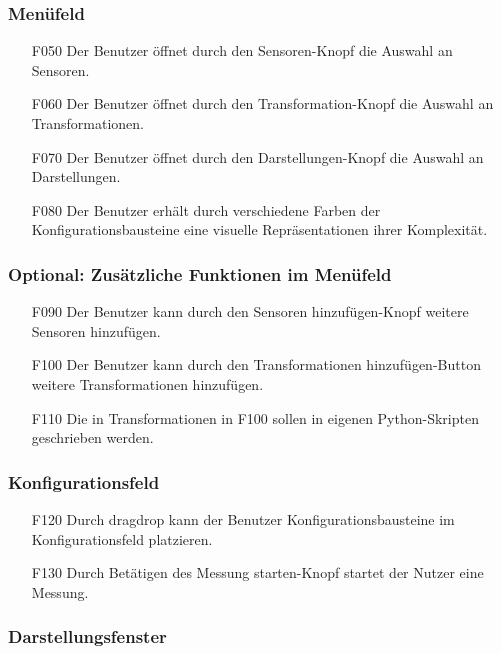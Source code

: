 \documentclass[parskip=full]{scrartcl}
\begin{document}
\subsubsection{Menüfeld}

\begin{itemize}
\item[F050] Der Benutzer öffnet durch den Sensoren-Knopf die Auswahl an Sensoren.
\item[F060] Der Benutzer öffnet durch den Transformation-Knopf die Auswahl an Transformationen.
\item[F070] Der Benutzer öffnet durch den Darstellungen-Knopf die Auswahl an Darstellungen.
\item[F080] Der Benutzer erhält durch verschiedene Farben der Konfigurationsbausteine eine visuelle Repräsentationen ihrer Komplexität.
\end{itemize}

\subsubsection{Optional: Zusätzliche Funktionen im Menüfeld}

\begin{itemize}

\item[F090] Der Benutzer kann durch den Sensoren hinzufügen-Knopf weitere Sensoren hinzufügen.
\item[F100] Der Benutzer kann durch den Transformationen hinzufügen-Button weitere Transformationen hinzufügen.
\item[F110] Die in Transformationen in F100 sollen in eigenen Python-Skripten geschrieben werden.
\end{itemize}

\subsubsection{Konfigurationsfeld}

\begin{itemize}
\item[F120] Durch \gls{dragdrop} kann der Benutzer Konfigurationsbausteine im Konfigurationsfeld platzieren.
\item[F130] Durch Betätigen des Messung starten-Knopf startet der Nutzer eine Messung.
\end{itemize}


\subsubsection{Darstellungsfenster}
\end{document}
